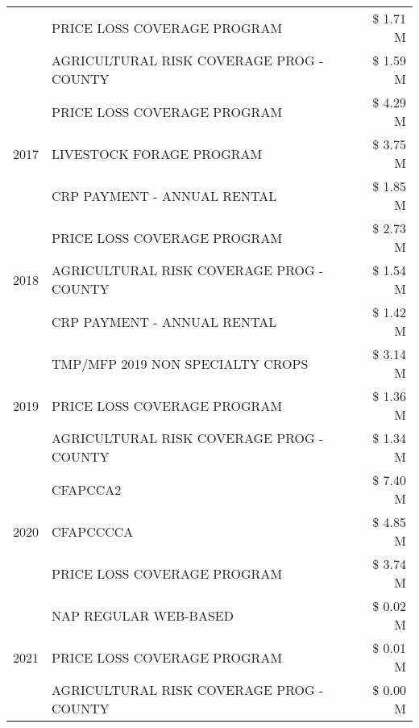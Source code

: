 \begin{tabular}{llr}
 & PRICE LOSS COVERAGE PROGRAM & \$ 1.71 M \\
 & AGRICULTURAL RISK COVERAGE PROG - COUNTY & \$ 1.59 M \\
\cline{1-3}
\multirow[t]{3}{*}{2017} & PRICE LOSS COVERAGE PROGRAM & \$ 4.29 M \\
 & LIVESTOCK FORAGE PROGRAM & \$ 3.75 M \\
 & CRP PAYMENT - ANNUAL RENTAL & \$ 1.85 M \\
\cline{1-3}
\multirow[t]{3}{*}{2018} & PRICE LOSS COVERAGE PROGRAM & \$ 2.73 M \\
 & AGRICULTURAL RISK COVERAGE PROG - COUNTY & \$ 1.54 M \\
 & CRP PAYMENT - ANNUAL RENTAL & \$ 1.42 M \\
\cline{1-3}
\multirow[t]{3}{*}{2019} & TMP/MFP 2019 NON SPECIALTY CROPS & \$ 3.14 M \\
 & PRICE LOSS COVERAGE PROGRAM & \$ 1.36 M \\
 & AGRICULTURAL RISK COVERAGE PROG - COUNTY & \$ 1.34 M \\
\cline{1-3}
\multirow[t]{3}{*}{2020} & CFAPCCA2 & \$ 7.40 M \\
 & CFAPCCCCA & \$ 4.85 M \\
 & PRICE LOSS COVERAGE PROGRAM & \$ 3.74 M \\
\cline{1-3}
\multirow[t]{3}{*}{2021} & NAP REGULAR WEB-BASED & \$ 0.02 M \\
 & PRICE LOSS COVERAGE PROGRAM & \$ 0.01 M \\
 & AGRICULTURAL RISK COVERAGE PROG - COUNTY & \$ 0.00 M \\
\cline{1-3}
\bottomrule
\end{tabular}
